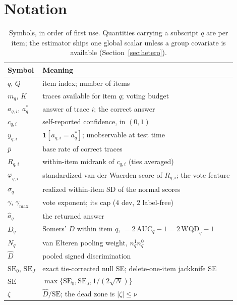 \documentclass{article}
\newcommand{\Dhat}{\widehat{D}}
\begin{document}
\section{Notation}\label{app:notation}
\begingroup
\setlength{\tabcolsep}{4pt}
\renewcommand{\arraystretch}{1.12}
\begin{table}[H]
\centering
\caption{Symbols, in order of first use. Quantities carrying a subscript $q$
are per item; the estimator ships one global scalar unless a group covariate is
available (Section~\ref{sec:hetero}).}
\label{tab:notation}
\footnotesize
\begin{tabular}{@{}p{2.7cm} p{11.5cm}@{}}
\toprule
Symbol & Meaning \\
\midrule
$q$, $Q$ & item index; number of items \\
$m_q$, $K$ & traces available for item $q$; voting budget \\
$a_{q,i}$, $a^\ast_q$ & answer of trace $i$; the correct answer \\
$c_{q,i}$ & self-reported confidence, in $(0,1)$ \\
$y_{q,i}$ & $\mathbf{1}[a_{q,i}=a^\ast_q]$; unobservable at test time \\
$\bar p$ & base rate of correct traces \\
\midrule
$R_{q,i}$ & within-item midrank of $c_{q,i}$ (ties averaged) \\
$\varphi_{q,i}$ & standardized van der Waerden score of $R_{q,i}$; the vote feature \\
$\sigma_q$ & realized within-item SD of the normal scores \\
$\gamma$, $\gamma_{\max}$ & vote exponent; its cap ($4$ dev, $2$ label-free) \\
$\hat a_q$ & the returned answer \\
\midrule
$D_q$ & Somers' $D$ within item $q$, $=2\,\mathrm{AUC}_q-1=2\,\mathrm{WQD}_q-1$ \\
$N_q$ & van Elteren pooling weight, $n^1_qn^0_q$ \\
$\Dhat$ & pooled signed discrimination \\
$\mathrm{SE}_0$, $\mathrm{SE}_J$ & exact tie-corrected null SE; delete-one-item jackknife SE \\
$\mathrm{SE}$ & $\max\{\mathrm{SE}_0,\mathrm{SE}_J,1/(2\sqrt N)\}$ \\
$\zeta$ & $\Dhat/\mathrm{SE}$; the dead zone is $|\zeta|\le\nu$ \\

\end{tabular}
\end{table}
\end{document}
